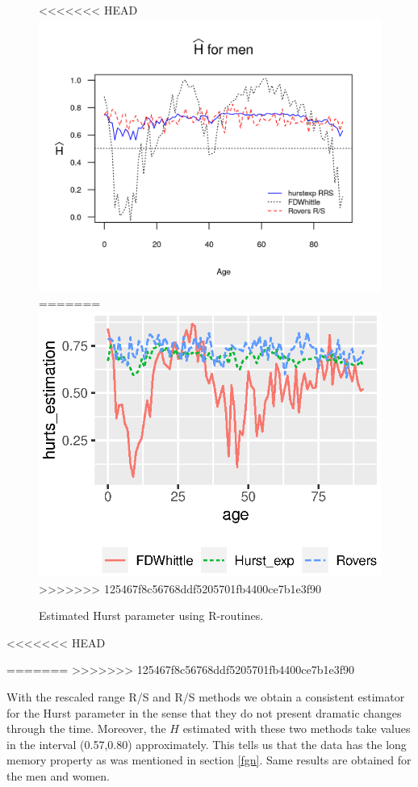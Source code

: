 \documentclass[smallextended]{svjour3}
\begin{document}
\begin{figure}[H]
<<<<<<< HEAD
    \includegraphics{Hurst-Men.png}
=======
    \includegraphics{Hurst-Women.eps}
>>>>>>> 125467f8c56768ddf5205701fb4400ce7b1e3f90
    \caption{Estimated Hurst parameter using R-routines.}
    \label{graph-Hurst_Est_Wo}
\end{figure}
<<<<<<< HEAD

=======
>>>>>>> 125467f8c56768ddf5205701fb4400ce7b1e3f90

With the rescaled range R/S and R/S  methods we obtain a consistent estimator
for the Hurst parameter in the sense that they do not present 
dramatic changes through the time. Moreover, the $H$ estimated with 
these two methods take values in the interval (0.57,0.80) approximately.
This tells us that the data has the long memory property as
was mentioned in section \ref{fgn}. Same results are obtained 
for the men and women.
%
\end{document}
